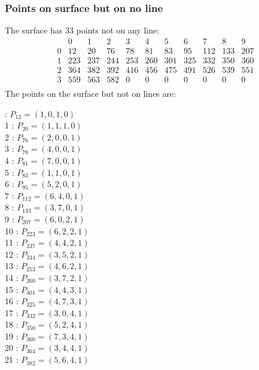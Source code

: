 \documentclass{article}
\begin{document}
{\subsubsection*{Points on surface but on no line}
The surface has 33 points not on any line:\\
$$
\begin{array}{r|*{10}{r}}
 & 0 & 1 & 2 & 3 & 4 & 5 & 6 & 7 & 8 & 9\\
\hline
0 & 12 & 20 & 76 & 78 & 81 & 83 & 95 & 112 & 133 & 207\\
1 & 223 & 237 & 244 & 253 & 260 & 301 & 325 & 332 & 350 & 360\\
2 & 364 & 382 & 392 & 416 & 456 & 475 & 491 & 526 & 539 & 551\\
3 & 559 & 563 & 582 & 0 & 0 & 0 & 0 & 0 & 0 & 0\\
\end{array}
$$
The points on the surface but not on lines are:\\
\begin{multicols}{2}
 : $P_{12}=( 1, 0, 1, 0 )$\\
1 : $P_{20}=( 1, 1, 1, 0 )$\\
2 : $P_{76}=( 2, 0, 0, 1 )$\\
3 : $P_{78}=( 4, 0, 0, 1 )$\\
4 : $P_{81}=( 7, 0, 0, 1 )$\\
5 : $P_{83}=( 1, 1, 0, 1 )$\\
6 : $P_{95}=( 5, 2, 0, 1 )$\\
7 : $P_{112}=( 6, 4, 0, 1 )$\\
8 : $P_{133}=( 3, 7, 0, 1 )$\\
9 : $P_{207}=( 6, 0, 2, 1 )$\\
10 : $P_{223}=( 6, 2, 2, 1 )$\\
11 : $P_{237}=( 4, 4, 2, 1 )$\\
12 : $P_{244}=( 3, 5, 2, 1 )$\\
13 : $P_{253}=( 4, 6, 2, 1 )$\\
14 : $P_{260}=( 3, 7, 2, 1 )$\\
15 : $P_{301}=( 4, 4, 3, 1 )$\\
16 : $P_{325}=( 4, 7, 3, 1 )$\\
17 : $P_{332}=( 3, 0, 4, 1 )$\\
18 : $P_{350}=( 5, 2, 4, 1 )$\\
19 : $P_{360}=( 7, 3, 4, 1 )$\\
20 : $P_{364}=( 3, 4, 4, 1 )$\\
21 : $P_{382}=( 5, 6, 4, 1 )$\\

\end{multicols}}
\end{document}

